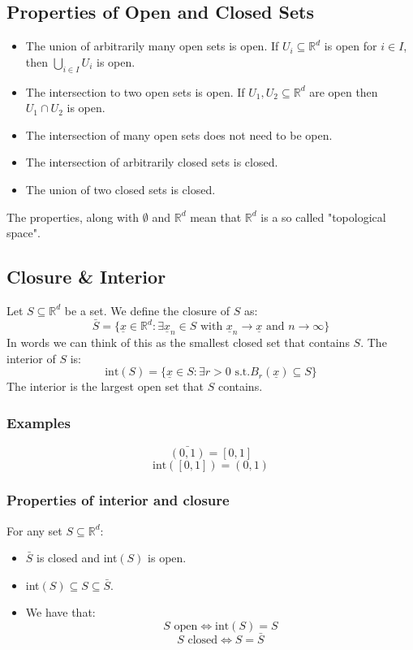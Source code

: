 \documentclass[12pt]{article}
\begin{document}
\subsection{Properties of Open and Closed Sets}
\begin{itemize}
    \item The union of arbitrarily many open sets is open. If \(U_i\subseteq\mathbb{R}^d\) is open for \(i\in I\), then \(\bigcup_{i\in I}U_i\) is open.
    \item The intersection to two open sets is open. If \(U_1,U_2\subseteq\mathbb{R}^d\) are open then \(U_1\cap U_2\) is open.
    \item The intersection of many open sets does not need to be open.
    \item The intersection of arbitrarily closed sets is closed.
    \item The union of two closed sets is closed.
\end{itemize}
The properties, along with \(\emptyset\) and \(\mathbb{R}^d\) mean that \(\mathbb{R}^d\) is a so called "topological space".
\subsection{Closure \& Interior}
Let \(S\subseteq\mathbb{R}^d\) be a set. We define the closure of \(S\) as:
\[\bar{S}=\{\underline{x}\in\mathbb{R}^d:\exists\underline{x}_n\in S \text{ with }\underline{x}_n\to\underline{x}\text{ and }n\to\infty\}\]
In words we can think of this as the smallest closed set that contains \(S\). The interior of \(S\) is:
\[\text{int}(S)=\{\underline{x}\in S:\exists r>0\text{ s.t.} B_r(\underline{x})\subseteq S\}\]
The interior is the largest open set that \(S\) contains.
\subsubsection*{Examples}
\[\bar{(0,1)}=[0,1]\]
\[\text{int}([0,1])=(0,1)\]
\subsubsection{Properties of interior and closure}
For any set \(S\subseteq\mathbb{R}^d\):
\begin{itemize}
    \item \(\bar{S}\) is closed and int\((S)\) is open.
    \item int\((S)\subseteq S\subseteq\bar{S}\).
    \item We have that:
    \[S\text{ open}\iff \text{int}(S)=S\]
    \[S\text{ closed}\iff S=\bar{S}\]
\end{itemize}
\end{document}
